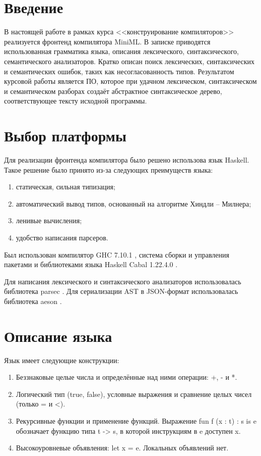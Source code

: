 \documentclass[a4paper,12pt]{article}
\numberwithin{equation}{section}
\begin{document}
\tableofcontents

\section{Введение}
В настоящей работе в рамках курса <<конструирование компиляторов>>
реализуется фронтенд компилятора MiniML. В записке приводятся
использованная грамматика языка, описания лексического,
синтаксического, семантического анализаторов. Кратко описан поиск
лексических, синтаксических и семантических ошибок, таких как
несогласованность типов. Результатом курсовой работы является ПО,
которое при удачном лексическом, синтаксическом и семантическом
разборах создаёт абстрактное синтаксическое дерево, соответствующее
тексту исходной программы.

\section{Выбор платформы} 
Для реализации фронтенда компилятора было решено использова язык
Haskell. Такое решение было принято из-за следующих преимуществ языка:
\begin{enumerate}
\item статическая, сильная типизация;
\item автоматический вывод типов, основанный на алгоритме Хиндли -- Милнера;
\item ленивые вычисления;
\item удобство написания парсеров.
\end{enumerate}
Был использован компилятор GHC 7.10.1 \cite{ghc}, система сборки и управления
пакетами и библиотеками языка Haskell Cabal 1.22.4.0 \cite{cabal}.


Для написания лексического и синтаксического анализаторов использовалась
библиотека parsec \cite{parsec}. Для сериализации AST в JSON-формат
использовалась библиотека aeson \cite{aeson}.

\section{Описание языка}
Язык имеет следующие конструкции:
\begin{enumerate}
\item Беззнаковые целые числа и определённые над ними операции: +, - и *.
\item Логический тип (true, false), условные выражения и сравнение
  целых чисел (только = и <).
\item Рекурсивные функции и применение функций. Выражение 
  fun f (x : t) : s is e обозначает функцию типа t -> s, в которой
  инструкциям в e доступен x.
\item Высокоуровневые объявления: let x = e. Локальных объявлений нет.
\end{enumerate}
\end{document}
